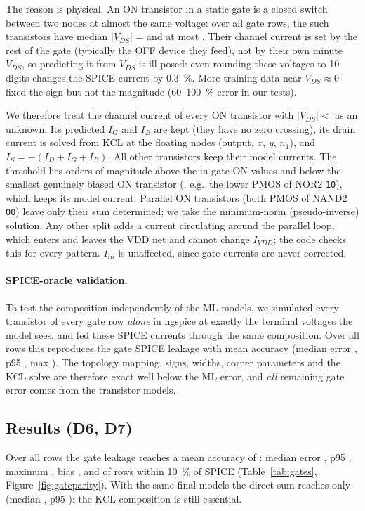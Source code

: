 The reason is physical. An ON transistor in a static gate is a closed switch between two nodes at
almost the same voltage: over all gate rows, the \OnVdsCount{} such transistors have median
$|V_{DS}|$ = \OnVdsMedian{} and at most \OnVdsMax. Their channel current is set by the rest of the
gate (typically the OFF device they feed), not by their own minute $V_{DS}$, so predicting it from
$V_{DS}$ is ill-posed: even rounding these voltages to 10 digits changes the SPICE current by
\qty{0.3}{\percent}. More training data near $V_{DS}\approx 0$ fixed the sign but not the
magnitude (60--\qty{100}{\percent} error in our tests).

We therefore treat the channel current of every ON transistor with $|V_{DS}| <$ \KclVdsMax{} as
an unknown. Its predicted $I_G$ and $I_B$ are kept (they have no zero crossing), its drain current
is solved from KCL at the floating nodes (output, $x$, $y$, $n_1$), and $I_S=-(I_D+I_G+I_B)$. All
other transistors keep their model currents. The threshold lies orders of magnitude above the
in-gate ON values and below the smallest genuinely biased ON transistor (\OnBiasedVdsMin, e.g.\
the lower PMOS of NOR2 \texttt{10}), which keeps its model current. Parallel ON transistors (both
PMOS of NAND2 \texttt{00}) leave only their sum determined; we take the minimum-norm
(pseudo-inverse) solution. Any other split adds a current circulating around the parallel loop,
which enters and leaves the VDD net and cannot change $I_{VDD}$; the code checks this for every
pattern. $I_{in}$ is unaffected, since gate currents are never corrected.

\paragraph{SPICE-oracle validation.}
To test the composition independently of the ML models, we simulated every transistor of every
gate row \emph{alone} in ngspice at exactly the terminal voltages the model sees, and fed these
SPICE currents through the same composition. Over all \NumGateSims{} rows this reproduces the
gate SPICE leakage with mean accuracy \OracleMeanAcc{} (median error \OracleMedianErr, p95
\OraclePninetyfiveErr, max \OracleMaxErr). The topology mapping, signs, widths, corner parameters
and the KCL solve are therefore exact well below the ML error, and \emph{all} remaining gate error
comes from the transistor models.

\subsection{Results (D6, D7)}
Over all rows the gate leakage reaches a mean accuracy of \GateMeanAcc{}: median error
\GateMedianErr, p95 \GatePninetyfiveErr, maximum \GateMaxErr, bias \GateBias, and \GateWithinTen{}
of rows within \qty{10}{\percent} of SPICE (Table~\ref{tab:gates}, Figure~\ref{fig:gateparity}).
With the same final models the direct sum reaches only \GateDirectMeanAcc{} (median
\GateDirectMedianErr, p95 \GateDirectPninetyfiveErr): the KCL composition is still essential.

